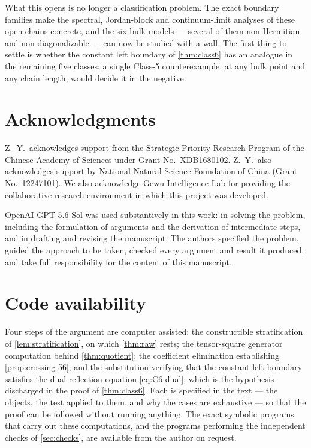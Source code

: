 \documentclass[11pt,reqno]{amsart}
\theoremstyle{plain}
\theoremstyle{definition}
\theoremstyle{remark}
\numberwithin{equation}{section}
\begin{document}
What this opens is no longer a classification problem. The exact boundary
families make the spectral, Jordan-block and continuum-limit analyses of these
open chains concrete, and the six bulk models --- several of them non-Hermitian
and non-diagonalizable --- can now be studied with a wall. The first thing to
settle is whether the constant left boundary of \cref{thm:class6} has an analogue
in the remaining five classes; a single Class-5 counterexample, at any bulk point
and any chain length, would decide it in the negative.

\section*{Acknowledgments}

Z.\ Y.\ acknowledges support from the Strategic Priority Research Program of the
Chinese Academy of Sciences under Grant No.~XDB1680102. Z.\ Y.\ also
acknowledges support by National Natural Science Foundation of China (Grant
No.~12247101). We also acknowledge Gewu Intelligence Lab for providing the
collaborative research environment in which this project was developed.

OpenAI GPT-5.6 Sol was used substantively in this work: in solving the
problem, including the formulation of arguments and the derivation of
intermediate steps, and in drafting and revising the manuscript. The authors
specified the problem, guided the approach to be taken, checked every argument
and result it produced, and take full responsibility for the content of this
manuscript.

\section*{Code availability}

Four steps of the argument are computer assisted: the constructible
stratification of \cref{lem:stratification}, on which \cref{thm:raw} rests; the
tensor-square generator computation behind \cref{thm:quotient}; the coefficient
elimination establishing \cref{prop:crossing-56}; and the substitution verifying
that the constant left boundary satisfies the dual reflection equation
\cref{eq:C6-dual}, which is the hypothesis discharged in the proof of
\cref{thm:class6}. Each is specified in the text --- the objects, the test applied
to them, and why the cases are exhaustive --- so that the proof can be followed
without running anything. The exact symbolic programs that carry out these
computations, and the programs performing the independent checks of
\cref{sec:checks}, are available from the author on request.



\end{document}
